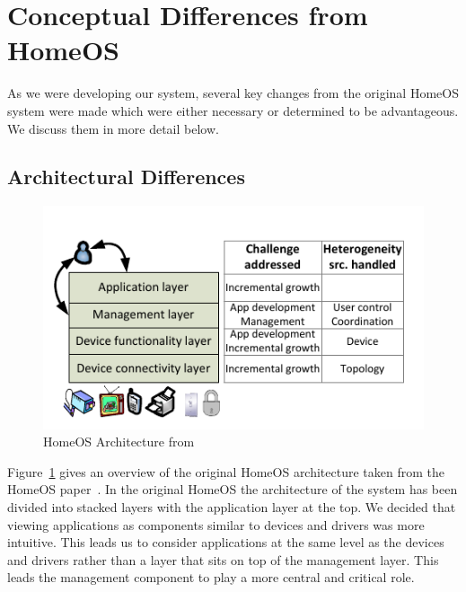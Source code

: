 \section{Conceptual Differences from HomeOS}                                                           
\label{sec:homeosdiff}
As we were developing our system, several key changes from the original HomeOS
system were made which were either necessary or determined to be advantageous.
We discuss them in more detail below.
\subsection{Architectural Differences}
\label{sec:archdiff} 
\begin{figure}[tbh]                                                              
    \centering                                                                   
    \includegraphics[width=1.0\columnwidth]{figs/homeosOrig.png}                     
    \caption{HomeOS Architecture from~\cite{homeOS}}                                 
    \label{Fig:homeosarch}                                                           
\end{figure}                                                                     
Figure~\ref{Fig:homeosarch} gives an overview of the original HomeOS
architecture taken from the HomeOS paper~\cite{homeOS}.
In the original HomeOS the architecture of the system has been divided into 
stacked layers with the application layer at the top. We decided that viewing
applications as components similar to devices and drivers was more intuitive.
This leads us to consider applications at the same level as the devices and
drivers rather than a layer that sits on top of the management layer. This leads
the management component to play a more central and critical role.

